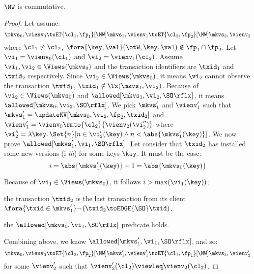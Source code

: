 \begin{lemma}
    \label{lem:mw-comm}
    \(\MW\) is commutative.
\end{lemma}
\begin{proof}
    Let assume:
    \[
        \mkvs_0, \vienv_0 \toET{\cl_1, \fp_1}[\MW] \mkvs_1, \vienv_1 \toET{\cl_2, \fp_2}[\MW] \mkvs_2, \vienv_2 
    \]
    where \( \cl_1 \neq \cl_2 \), \( \fora{ \key,\val } (\otW, \key, \val) \notin \fp_1 \cap \fp_2 \).
    Let \(\vi_1 = \vienv_0(\cl_1) \) and \( \vi_2 = \vienv_1(\cl_2)\).
    Assume \( \vi_1, \vi_2 \in \Views(\mkvs_0)\) and the transaction identifiers are \( \txid_1 \) and \( \txid_2 \) respectively.
    Since \( \vi_2  \in \Views(\mkvs_0) \), it means \( \vi_2 \) cannot observe the transaction \( \txid_1 \), \ie \( \txid_1 \notin \Tx(\mkvs_1,\vi_2) \).
    Because of \( \vi_2  \in \Views(\mkvs_0) \) and \( \allowed[\mkvs_1,\vi_2,\SO\rflx] \), it means \( \allowed[\mkvs_0,\vi_2,\SO\rflx] \).
    We pick \( \mkvs'_1 \) and \( \vienv'_1 \) such that \( \mkvs'_1 = \updateKV[\mkvs_0,\vi_2,\fp_2,\txid_2] \) and \( \vienv'_1 = \vienv_0\rmto{\cl_2}{\vienv_2(\vi''_2)} \)
    where \( \vi''_2 = \lambda \key \ldotp \Set{ n }[ n \in \vi'_2(\key) \land n < \abs{\mkvs'_1(\key)}] \).
    We now prove \( \allowed[\mkvs'_1,\vi_1,\SO\rflx] \).
    Let consider that \( \txid_2 \) has installed some new versions (i-\emph{th}) for some keys \( \key \).
    It must be the case:
    \[
        i = \abs{\mkvs'_1(\key)} - 1  = \abs{\mkvs_0(\key)}
    \]
    \begin{enumerate*}
        \item Because of \( \vi_1 \in \Views(\mkvs_0)\), it follows \( i > \max(\vi_1(\key))\);
        \item the transaction \( \txid_2 \) is the last transaction from its client \( \fora{ \txid \in \mkvs'_1} \neg \left(\txid_2 \toEDGE{\SO} \txid\right) \).
        \item the \(\allowed[\mkvs_0,\vi_1,\SO\rflx] \) predicate holds.
    \end{enumerate*}
    Combining above, we know \( \allowed[\mkvs'_1,\vi_1,\SO\rflx] \), and so:
    \[
        \mkvs_0, \vienv_0 \toET{\cl_2, \fp_2}[\MW] \mkvs'_1, \vienv'_1 \toET{\cl_1,\fp_1}[\MW] \mkvs_2, \vienv'_2 
    \]
    for some \( \vienv'_2 \) such that \( \vienv'_2(\cl_2) \viewleq \vienv_2(\cl_2) \).
\end{proof}


